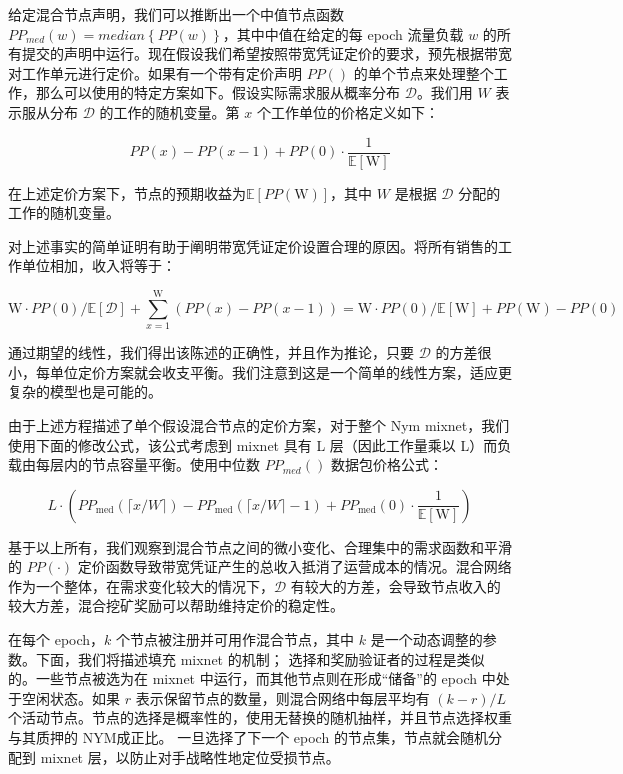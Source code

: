 \documentclass{article}
\begin{document}
	给定混合节点声明，我们可以推断出一个中值节点函数 $PP_{med}(w) = median\left \{PP(w)  \right \} $，其中中值在给定的每 epoch 流量负载 $w$ 的所有提交的声明中运行。现在假设我们希望按照带宽凭证定价的要求，预先根据带宽对工作单元进行定价。如果有一个带有定价声明 $PP()$ 的单个节点来处理整个工作，那么可以使用的特定方案如下。假设实际需求服从概率分布 $\mathcal{D}$。我们用 $W$ 表示服从分布 $\mathcal{D}$ 的工作的随机变量。第 $x$ 个工作单位的价格定义如下：

\begin{equation}\nonumber
PP(x)-P P(x-1)+P P(0) \cdot \frac{1}{\mathbb{E}[\mathrm{W}]}
\end{equation}

	在上述定价方案下，节点的预期收益为$\mathbb{E}[PP(\mathrm{W})]$，其中 $W$ 是根据 $\mathcal{D}$ 分配的工作的随机变量。

	对上述事实的简单证明有助于阐明带宽凭证定价设置合理的原因。将所有销售的工作单位相加，收入将等于：
	
\begin{equation}\nonumber
\mathrm{W} \cdot PP(0) / \mathbb{E}[\mathcal{D}]+\sum_{x=1}^{\mathrm{W}}(PP(x)-PP(x-1))=\mathrm{W} \cdot PP(0) / \mathbb{E}[\mathrm{W}]+PP(\mathrm{W})-PP(0)
\end{equation}

	通过期望的线性，我们得出该陈述的正确性，并且作为推论，只要 $\mathcal{D}$ 的方差很小，每单位定价方案就会收支平衡。我们注意到这是一个简单的线性方案，适应更复杂的模型\cite{ref5, ref67}也是可能的。\newline

	由于上述方程描述了单个假设混合节点的定价方案，对于整个 Nym mixnet，我们使用下面的修改公式，该公式考虑到 mixnet 具有 L 层（因此工作量乘以 L）而负载由每层内的节点容量平衡。使用中位数 $PP_{med}()$ 数据包价格公式：

\begin{equation}\nonumber
L \cdot\left(PP_{\operatorname{med}}(\lceil x / W\rceil)-PP_{\operatorname{med}}(\lceil x / W\rceil-1)+PP_{\operatorname{med}}(0) \cdot \frac{1}{\mathbb{E}[\mathrm{W}]}\right)
\end{equation}

	基于以上所有，我们观察到混合节点之间的微小变化、合理集中的需求函数和平滑的 $PP(·)$ 定价函数导致带宽凭证产生的总收入抵消了运营成本的情况。混合网络作为一个整体，在需求变化较大的情况下，$\mathcal{D}$ 有较大的方差，会导致节点收入的较大方差，混合挖矿奖励可以帮助维持定价的稳定性\cite{ref59}。\newline

	在每个 epoch，$k$ 个节点被注册并可用作混合节点，其中 $k$ 是一个动态调整的参数。下面，我们将描述填充 mixnet 的机制； 选择和奖励验证者的过程是类似的。一些节点被选为在 mixnet 中运行，而其他节点则在形成“储备”的 epoch 中处于空闲状态。如果 $r$ 表示保留节点的数量，则混合网络中每层平均有 $(k − r)/L$ 个活动节点。节点的选择是概率性的，使用无替换的随机抽样，并且节点选择权重与其质押的 NYM成正比。 一旦选择了下一个 epoch 的节点集，节点就会随机分配到 mixnet 层，以防止对手战略性地定位受损节点。\newline
\end{document}
